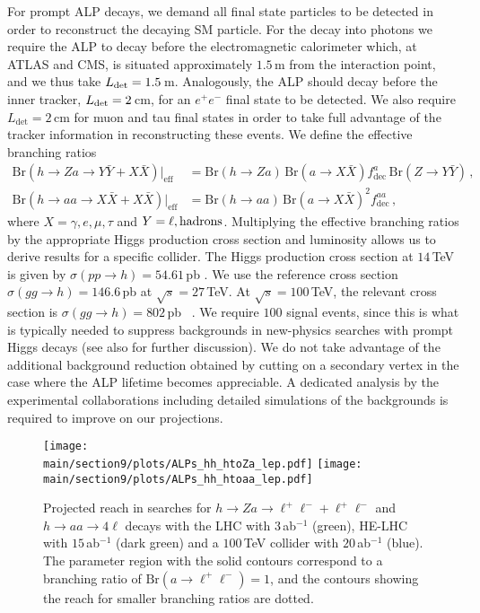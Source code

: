 For prompt ALP decays, we demand all final state particles to be detected in order to reconstruct the decaying SM particle. For the decay into photons we 
require the ALP to decay before the electromagnetic calorimeter which, at ATLAS and CMS, is situated approximately $1.5\,$m from the interaction point, and we thus take $L_{\rm det} = 
1.5\,$m. Analogously, the ALP should decay before the inner tracker, $L_{\rm det} = 2\,$cm, for an $e^+e^-$ final state to be detected. We also require $L_\text{det}
=2\,$cm for muon and tau final states in order to take full advantage of the tracker information in reconstructing these events. We define the effective branching ratios
%
\begin{align}
\text{Br}(h\to Za\to Y\bar{Y}+X\bar{X})\big\vert_\text{eff}&=\text{Br}(h\to Za)\,\text{Br}(a\to X\bar{X})f_\text{dec}^a\,\text{Br}(Z\to Y\bar{Y})\,,\label{eq:LHChZa}\\
\text{Br}(h\to aa\to X\bar{X}+X\bar{X})\big\vert_\text{eff}&=\text{Br}(h\to aa)\,\text{Br}(a\to X\bar{X})^2f_\text{dec}^{aa}\,,\label{eq:LHChaa}
\end{align}
%
where $X=\gamma, e, \mu, \tau$ and $Y=\ell, {\rm hadrons}$. Multiplying the effective branching ratios by the appropriate Higgs production cross section and luminosity allows us to derive results for a specific collider. The Higgs production cross section at $14\,$TeV is given by $\sigma(pp\to h)= 54.61\,$pb \cite{Anastasiou:2016cez}. We use the reference cross section $\sigma(gg 
\to h) = 146.6\,$pb \cite{Twiki} at $\sqrt{s} = 27\,$TeV. At $\sqrt{s} = 100\,$TeV, the relevant cross section is $\sigma(gg \to h) = 802\,$pb ~\cite{Mangano:2016jyj}. We require $100$ signal events, since this is what is typically needed to suppress backgrounds in new-physics searches with prompt Higgs decays \cite{Khachatryan:2016vau, Chatrchyan:2013vaa,Aad:2015bua} (see also \cite{Bauer:2017ris} for 
further discussion).
We do not take advantage of the additional background reduction obtained by cutting on a secondary vertex in the case where the ALP lifetime becomes appreciable. A dedicated analysis by the experimental collaborations including detailed simulations of the backgrounds is required to improve on our projections.  


%
\begin{figure}[t]
\begin{center}
\texttt{[image: \\main/section9/plots/ALPs\_hh\_htoZa\_lep.pdf]}
\texttt{[image: \\main/section9/plots/ALPs\_hh\_htoaa\_lep.pdf]}
\end{center}
\vspace{-3mm}
\caption{\label{fig:pphZalep} Projected reach in searches for $h \to Za \to \ell^+\ell^-+\ell^+\ell^- $ and $h \to aa \to 4\ell $ decays with the LHC with $3$\,ab$^{-1}$
(green), HE-LHC with $15$\,ab$^{-1}$ (dark green) and a $100\,$TeV collider with $20$\,ab$^{-1}$ (blue). The parameter region with the solid contours correspond to a branching ratio of $\text{Br}(a\to 
\ell^+\ell^-)=1$, and the contours showing the reach for smaller branching ratios are dotted.}
\end{figure}
%

